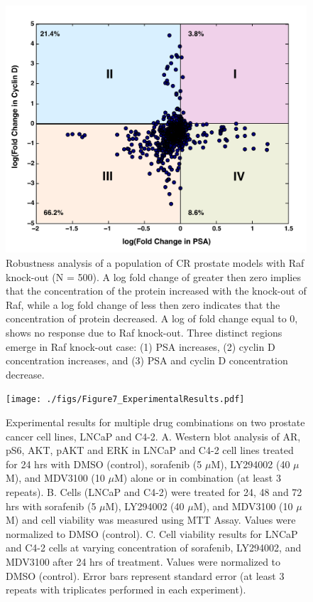\documentclass[12pt]{article}
\begin{document}
\begin{figure}\centering
\includegraphics[width=1.0\textwidth]{./figs/Figure6_RAF_K0_C81.pdf}
\caption{Robustness analysis of a population of CR prostate models with Raf knock-out (N = 500). A log fold change of greater then zero implies that the concentration of the protein increased with the knock-out of Raf, while a log fold change of less then zero indicates that the concentration of protein decreased. A log of fold change equal to 0, shows no response due to Raf knock-out. Three distinct regions emerge in Raf knock-out case: (1) PSA increases, (2) cyclin D concentration increases, and (3) PSA and cyclin D concentration decrease. }
\label{fg:Robustness}
\end{figure}

\clearpage

\begin{figure}\centering
\texttt{[image: ./figs/Figure7\_ExperimentalResults.pdf]}
\caption{Experimental results for multiple drug combinations on two prostate cancer cell lines, LNCaP and C4-2. A. Western blot analysis of AR, pS6, AKT, pAKT and ERK in LNCaP and C4-2 cell lines treated for 24 hrs with DMSO (control), sorafenib (5 $\mu$M), LY294002 (40 $\mu$M), and MDV3100 (10 $\mu$M) alone or in combination (at least 3 repeats). B. Cells (LNCaP and C4-2) were treated for 24, 48 and 72 hrs with sorafenib (5 $\mu$M), LY294002 (40 $\mu$M), and MDV3100 (10 $\mu$M) and cell viability was measured using MTT Assay. Values were normalized to DMSO (control). C. Cell viability results for LNCaP and C4-2 cells at varying concentration of sorafenib, LY294002, and MDV3100 after 24 hrs of treatment. Values were normalized to DMSO (control). Error bars represent standard error (at least 3 repeats with triplicates performed in each experiment).}
\label{fg:Experiment}
\end{figure}
\end{document}
